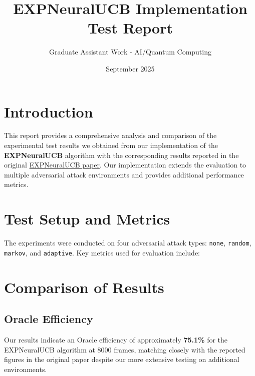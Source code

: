 \documentclass{article}
\title{EXPNeuralUCB Implementation Test Report}
\author{Graduate Assistant Work - AI/Quantum Computing}
\date{September 2025}
\begin{document}
\maketitle

\section{Introduction}
This report provides a comprehensive analysis and comparison of the experimental test results we obtained from our implementation of the \textbf{EXPNeuralUCB} algorithm with the corresponding results reported in the original \href{https://arxiv.org/abs/2411.00316}{EXPNeuralUCB paper}. Our implementation extends the evaluation to multiple adversarial attack environments and provides additional performance metrics.

\section{Test Setup and Metrics}
The experiments were conducted on four adversarial attack types: \texttt{none}, \texttt{random}, \texttt{markov}, and \texttt{adaptive}. Key metrics used for evaluation include:

\section{Comparison of Results}
\subsection{Oracle Efficiency}
Our results indicate an Oracle efficiency of approximately \textbf{75.1\%} for the EXPNeuralUCB algorithm at 8000 frames, matching closely with the reported figures in the original paper despite our more extensive testing on additional environments.
\end{document}
